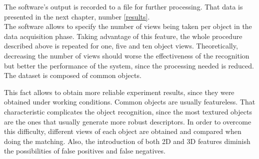 		The software's output is recorded to a file for further processing. 
		That data is presented in the next chapter, number \ref{results}.
		\\

		The software allows to specify the number of views being taken per object in the data acquisition phase. 
		Taking advantage of this feature, the whole procedure described above is repeated for one, five and ten object views.
		Theoretically, decreasing the number of views should worse the effectiveness of the recognition but better the performance of the system, since the processing needed is reduced.
		\\%

		The dataset is composed of common objects. 

		This fact allows to obtain more reliable experiment results, since they were obtained under working conditions. 
		Common objects are usually featureless. 
		That characteristic complicates the object recognition, since the most textured objects are the ones that usually generate more robust descriptors. 
		In order to overcome this difficulty, different views of each object are obtained and compared when doing the matching. 
		Also, the introduction of both 2D and 3D features diminish the possibilities of false positives and false negatives. 
		\\%




